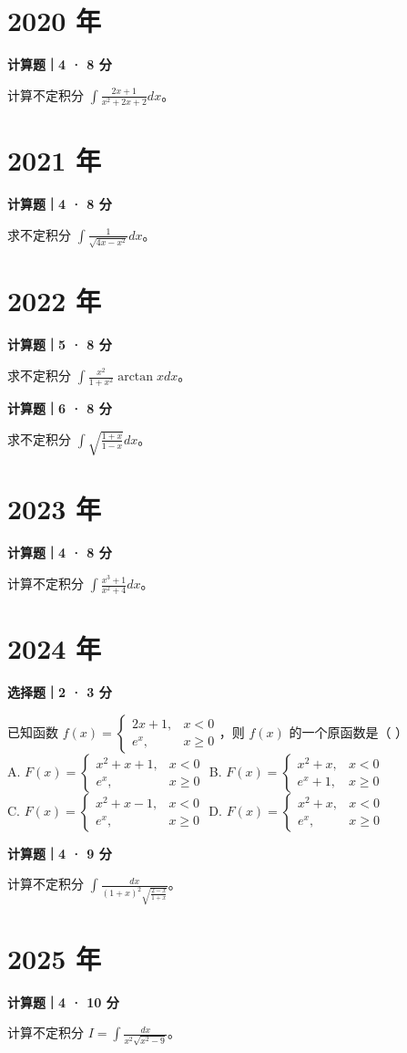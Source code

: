 

\section*{2020 年}


\textbf{计算题｜4 · 8 分}

计算不定积分 $\int \frac{2x+1}{x^2+2x+2} dx$。


\section*{2021 年}


\textbf{计算题｜4 · 8 分}

求不定积分 $\int \frac{1}{\sqrt{4x-x^2}} dx$。


\section*{2022 年}


\textbf{计算题｜5 · 8 分}

求不定积分 $\int \frac{x^2}{1+x^2} \arctan x dx$。


\textbf{计算题｜6 · 8 分}

求不定积分 $\int \sqrt{\frac{1+x}{1-x}} dx$。


\section*{2023 年}


\textbf{计算题｜4 · 8 分}

计算不定积分 $\int \frac{x^3+1}{x^2+4} dx$。


\section*{2024 年}


\textbf{选择题｜2 · 3 分}

已知函数 $f(x) = \begin{cases} 2x+1, & x < 0 \\ e^x, & x \ge 0 \end{cases}$，则 $f(x)$ 的一个原函数是（ \quad ）\\
A. $F(x) = \begin{cases} x^2+x+1, & x < 0 \\ e^x, & x \ge 0 \end{cases}$ \quad B. $F(x) = \begin{cases} x^2+x, & x < 0 \\ e^x+1, & x \ge 0 \end{cases}$\\
C. $F(x) = \begin{cases} x^2+x-1, & x < 0 \\ e^x, & x \ge 0 \end{cases}$ \quad D. $F(x) = \begin{cases} x^2+x, & x < 0 \\ e^x, & x \ge 0 \end{cases}$


\textbf{计算题｜4 · 9 分}

计算不定积分 $\int \frac{dx}{(1+x)^2\sqrt{\frac{2-x}{1+x}}}$。


\section*{2025 年}


\textbf{计算题｜4 · 10 分}

计算不定积分 $I = \int \frac{dx}{x^2\sqrt{x^2-9}}$。
